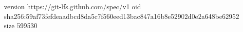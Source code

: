version https://git-lfs.github.com/spec/v1
oid sha256:59af73fefdeaadbcd8da5c7f560eed13bac847a16b8e52902d0e2a648be62952
size 599530
